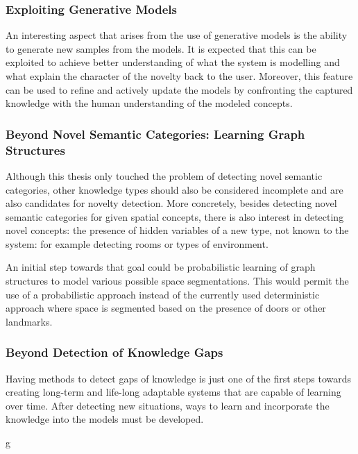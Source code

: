 \subsubsection*{Exploiting Generative Models}
An interesting aspect that arises from the use of generative models is the ability to generate new
samples from the models. It is expected that this can be exploited to achieve better understanding
of what the system is modelling and what explain the character of the novelty back to the user.
Moreover, this feature can be used to refine and actively update the models by confronting the captured 
knowledge with the human understanding of the modeled concepts.

\subsubsection*{Beyond Novel Semantic Categories: Learning Graph Structures}
Although this thesis only touched the problem of detecting novel semantic categories, other knowledge
types should also be considered incomplete and are also candidates for novelty detection.
More concretely, besides detecting novel semantic categories for given spatial concepts, there is
also interest in detecting novel concepts: the presence of hidden variables of a new type, not known
to the system: for example detecting rooms or types of environment.

An initial step towards that goal could be probabilistic learning of graph structures to model various
possible space segmentations. This would permit the use of a probabilistic approach instead of the currently used
deterministic approach where space is segmented based on the presence of doors or other landmarks.

\subsubsection*{Beyond Detection of Knowledge Gaps}
Having methods to detect gaps of knowledge is just one of the first steps towards creating long-term and
life-long adaptable systems that are capable of learning over time. After detecting new
situations, ways to learn and incorporate the knowledge into the models must be developed.

g